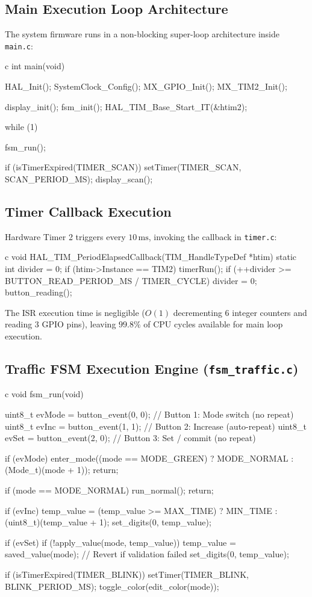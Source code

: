 \documentclass{hcmut-report}
\begin{document}
\subsection{Main Execution Loop Architecture}
The system firmware runs in a non-blocking super-loop architecture inside \texttt{main.c}:
\begin{code}{c}
int main(void)
{
  HAL_Init();
  SystemClock_Config();
  MX_GPIO_Init();
  MX_TIM2_Init();

  display_init();
  fsm_init();
  HAL_TIM_Base_Start_IT(&htim2);

  while (1)
  {
    fsm_run();

    if (isTimerExpired(TIMER_SCAN)) {
      setTimer(TIMER_SCAN, SCAN_PERIOD_MS);
      display_scan();
    }
  }
}
\end{code}

\subsection{Timer Callback Execution}
Hardware Timer 2 triggers every $10\,\text{ms}$, invoking the callback in \texttt{timer.c}:
\begin{code}{c}
void HAL_TIM_PeriodElapsedCallback(TIM_HandleTypeDef *htim)
{
  static int divider = 0;
  if (htim->Instance == TIM2) {
    timerRun();
    if (++divider >= BUTTON_READ_PERIOD_MS / TIMER_CYCLE) {
      divider = 0;
      button_reading();
    }
  }
}
\end{code}
The ISR execution time is negligible ($O(1)$ decrementing 6 integer counters and reading 3 GPIO pins), leaving $99.8\%$ of CPU cycles available for main loop execution.

\subsection{Traffic FSM Execution Engine (\texttt{fsm\_traffic.c})}
\begin{code}{c}
void fsm_run(void)
{
  uint8_t evMode = button_event(0, 0);   // Button 1: Mode switch (no repeat)
  uint8_t evInc  = button_event(1, 1);   // Button 2: Increase (auto-repeat)
  uint8_t evSet  = button_event(2, 0);   // Button 3: Set / commit (no repeat)

  if (evMode) {
    enter_mode((mode == MODE_GREEN) ? MODE_NORMAL : (Mode_t)(mode + 1));
    return;
  }

  if (mode == MODE_NORMAL) {
    run_normal();
    return;
  }

  if (evInc) {
    temp_value = (temp_value >= MAX_TIME) ? MIN_TIME : (uint8_t)(temp_value + 1);
    set_digits(0, temp_value);
  }

  if (evSet) {
    if (!apply_value(mode, temp_value)) {
      temp_value = saved_value(mode);    // Revert if validation failed
    }
    set_digits(0, temp_value);
  }

  if (isTimerExpired(TIMER_BLINK)) {
    setTimer(TIMER_BLINK, BLINK_PERIOD_MS);
    toggle_color(edit_color(mode));
  }
}
\end{code}
\end{document}
